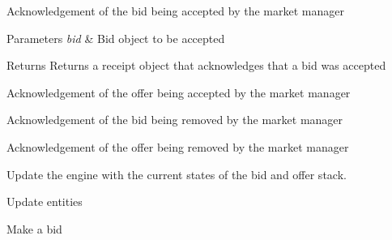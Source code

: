 \begin{DoxyRefList}
\item[\label{todo__todo000005}%
\hypertarget{todo__todo000005}{}%
Member \hyperlink{classfinancialmarketsimulator_1_1_market_manager_a628b1d67f2d120933d52c0311f733a8e}{financialmarketsimulator.Market\+Manager.accept\+Bid} (Bid bid)]Acknowledgement of the bid being accepted by the market manager 
\begin{DoxyParams}{Parameters}
{\em bid} & Bid object to be accepted \\
\hline
\end{DoxyParams}
\begin{DoxyReturn}{Returns}
Returns a receipt object that acknowledges that a bid was accepted  
\end{DoxyReturn}

\item[\label{todo__todo000006}%
\hypertarget{todo__todo000006}{}%
Member \hyperlink{classfinancialmarketsimulator_1_1_market_manager_a46a095623bcda32e2ff6f3d85b4f8994}{financialmarketsimulator.Market\+Manager.accept\+Offer} (Offer offer)]Acknowledgement of the offer being accepted by the market manager 
\item[\label{todo__todo000007}%
\hypertarget{todo__todo000007}{}%
Member \hyperlink{classfinancialmarketsimulator_1_1_market_manager_aa8c0454b1d66599ff5abbb01d35790e8}{financialmarketsimulator.Market\+Manager.remove\+Bid} (Bid bid)]Acknowledgement of the bid being removed by the market manager 
\item[\label{todo__todo000008}%
\hypertarget{todo__todo000008}{}%
Member \hyperlink{classfinancialmarketsimulator_1_1_market_manager_ad49a43c96b962562014c7bb37dfa5f7e}{financialmarketsimulator.Market\+Manager.remove\+Offer} (Offer offer)]Acknowledgement of the offer being removed by the market manager 
\item[\label{todo__todo000009}%
\hypertarget{todo__todo000009}{}%
Member \hyperlink{classfinancialmarketsimulator_1_1_market_manager_afb2bf557ed70cd23feccddfb5c01ab0d}{financialmarketsimulator.Market\+Manager.update\+Engine} ()]Update the engine with the current states of the bid and offer stack.  
\item[\label{todo__todo000010}%
\hypertarget{todo__todo000010}{}%
Member \hyperlink{classfinancialmarketsimulator_1_1_market_manager_a32d674b201543e3a6783ec64ba172266}{financialmarketsimulator.Market\+Manager.update\+Entities} ()]Update entities  
\item[\label{todo__todo000012}%
\hypertarget{todo__todo000012}{}%
Member \hyperlink{interfacefinancialmarketsimulator_1_1_trade_ab84e578afb7f519b018ebc0ffaab4d2a}{financialmarketsimulator.Trade.make\+Bid} ()]Make a bid 

\end{DoxyRefList}

